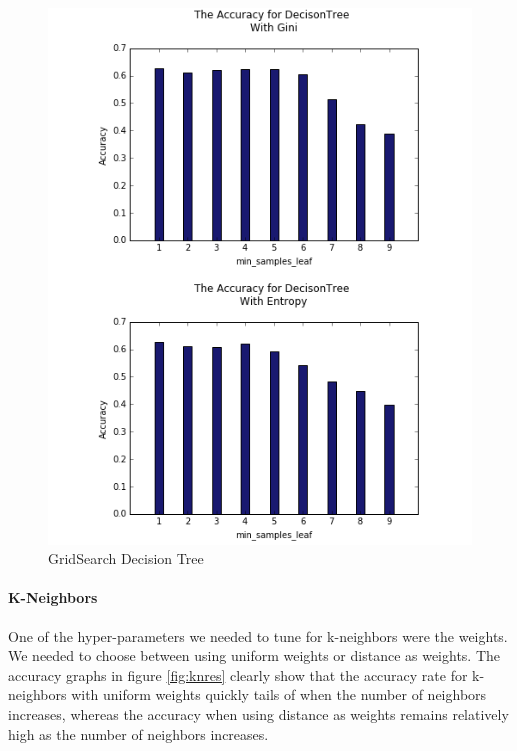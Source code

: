 \documentclass{article}
\begin{document}
\begin{figure}
\includegraphics[scale=0.6]{d_trees_crop}
\caption{GridSearch Decision Tree}
\label{fig:dtres}
\end{figure}

\paragraph{K-Neighbors}
One of the hyper-parameters we needed to tune for k-neighbors were the weights. We needed to choose between using uniform weights or distance as weights. The accuracy graphs in figure \ref{fig:knres} clearly show that the accuracy rate for k-neighbors with uniform weights quickly tails of when the number of neighbors increases, whereas the accuracy when using distance as weights remains relatively high as the number of neighbors increases. 
\end{document}
